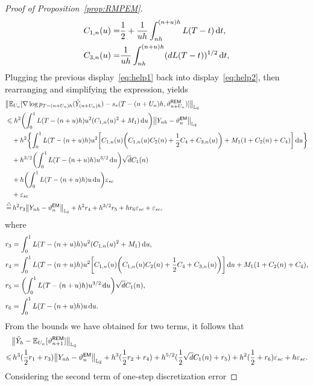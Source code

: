 \begin{proof}[Proof of Proposition~\ref{prop:RMPEM}]
\begin{align*}
    C_{1,n}(u)=&\dfrac{1}{2}+\dfrac{1}{uh}\int_{nh}^{(n+u)h}L(T-t){\,\rm d} t,\\
    C_{3,n}(u)=&\dfrac{1}{uh}\int_{nh}^{(n+u)h}(dL(T-t))^{1/2}{\,\rm d} t,
\end{align*}
Plugging the previous display~\eqref{eq:help1} back into display~\eqref{eq:help2}, then rearranging and simplifying the expression, yields
\begin{align*}
    &\left\lVert\mathbb{E}_{U_n}[\nabla\log p_{T-(n+U_n)h}(\tilde{Y}_{(n+U_n)h})-s_*(T-(n+U_n)h,\vartheta_{n+U_n}^{\sf REM})]\right\rVert_{\Ltwo}\\
   & \leqslant h^2\left(\int_0^1L(T-(n+u)h)u^2(C_{1,n}(u)^2+M_1)\rmd u\right)\l|Y_{nh}-\vartheta_n^{\sf EM}\r|_{\Ltwo}\\
    &\quad +h^2\left\{\int_0^1L(T-(n+u)h)u^2\left[C_{1,n}(u)\left(C_{1,n}(u)C_2(n)+\dfrac{1}{2}C_4+C_{3,n}(u)\right)+M_1(1+C_2(n)+C_4)\right]\rmd u\right\}\\
    &\quad +h^{3/2}\left(\int_0^1L(T-(n+u)h)u^{3/2}\rmd u\right)\sqrt{d}C_1(n)\\
    &\quad +h\left(\int_0^1L(T-(n+u)h)u\rmd u\right)\varepsilon_{sc}\\
    &\quad +\varepsilon_{sc}\\
    & \mathop{=}^{\triangle}h^2r_3\l|Y_{nh}-\vartheta_n^{\sf EM}\r|_{\Ltwo}+h^2r_4+h^{3/2}r_5+hr_6\varepsilon_{sc}+\varepsilon_{sc},
\end{align*}
where
\begin{align*}
    r_3&=\int_0^1L(T-(n+u)h)u^2(C_{1,n}(u)^2+M_1)\rmd u,\\
    r_4&=\int_0^1L(T-(n+u)h)u^2\left[C_{1,n}(u)\left(C_{1,n}(u)C_2(n)+\dfrac{1}{2}C_4+C_{3,n}(u)\right)\right]\rmd u+M_1(1+C_2(n)+C_4),\\
    r_5&=\left(\int_0^1L(T-(n+u)h)u^{3/2}\rmd u\right)\sqrt{d}C_1(n),\\
    r_6&=\int_0^1L(T-(n+u)h)u\rmd u.
\end{align*}
From the bounds we have obtained for two terms, it follows that
\begin{align*}
    &\l|\tilde{Y}_{h}-\mathbb{E}_{U_n}[\vartheta_{n+1}^{\sf REM}]\r|_{\Ltwo}\\
    \leqslant& \,h^3(\dfrac{1}{2}r_1+r_3)\l|Y_{nh}-\vartheta_n^{\sf EM}\r|_{\Ltwo}+h^3(\dfrac{1}{2}r_2+r_4)+h^{5/2}(\dfrac{1}{2}\sqrt{d}C_1(n)+r_5)+h^2(\dfrac{1}{2}+r_6)\varepsilon_{sc}+h\varepsilon_{sc}.
\end{align*}
Considering the second term of one-step discretization error

\end{proof}
